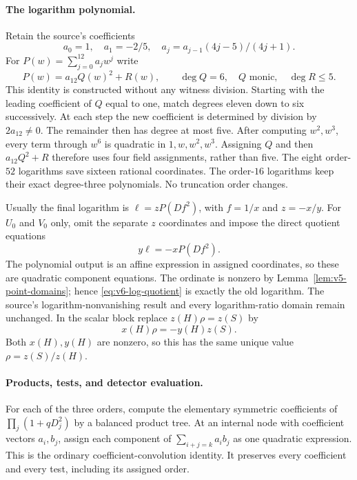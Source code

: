 \paragraph{The logarithm polynomial.}
Retain the source's coefficients
\[
 a_0=1,\quad a_1=-2/5,\quad
 a_j=a_{j-1}(4j-5)/(4j+1).
\]
For $P(w)=\sum_{j=0}^{12}a_jw^j$ write
\begin{equation}\label{eq:v6-log-square-completion}
 P(w)=a_{12}Q(w)^2+R(w),\qquad
 \deg Q=6,\quad Q\text{ monic},\quad\deg R\le5.
\end{equation}
This identity is constructed without any witness division. Starting
with the leading coefficient of $Q$ equal to one, match degrees eleven
down to six successively. At each step the new coefficient is determined
by division by $2a_{12}\ne0$. The remainder then has degree at most five.
After computing $w^2,w^3$, every term through $w^6$ is quadratic in
$1,w,w^2,w^3$. Assigning $Q$ and then $a_{12}Q^2+R$ therefore uses
four field assignments, rather than five. The eight order-$52$
logarithms save sixteen rational coordinates. The order-$16$ logarithms
keep their exact degree-three polynomials. No truncation order changes.

Usually the final logarithm is $\ell=zP(Df^2)$, with
$f=1/x$ and $z=-x/y$. For $U_0$ and $V_0$ only, omit the separate $z$
coordinates and impose the direct quotient equations
\begin{equation}\label{eq:v6-log-quotient}
 y\ell=-xP(Df^2).
\end{equation}
The polynomial output is an affine expression in assigned coordinates,
so these are quadratic component equations. The ordinate is nonzero by
Lemma~\ref{lem:v5-point-domains}; hence \eqref{eq:v6-log-quotient}
is exactly the old logarithm. The source's logarithm-nonvanishing result
and every logarithm-ratio domain remain unchanged. In the scalar block
replace $z(H)\rho=z(S)$ by
\begin{equation}\label{eq:v6-scalar-ratio}
 x(H)\rho=-y(H)z(S).
\end{equation}
Both $x(H),y(H)$ are nonzero, so this has the same unique value
$\rho=z(S)/z(H)$.

\paragraph{Products, tests, and detector evaluation.}
For each of the three orders, compute the elementary symmetric
coefficients of $\prod_j(1+qD_j^2)$ by a balanced product tree.
At an internal node with coefficient vectors $a_i,b_j$, assign each
component of $\sum_{i+j=k}a_ib_j$ as one quadratic expression.
This is the ordinary coefficient-convolution identity. It preserves
every coefficient and every test, including its assigned order.

